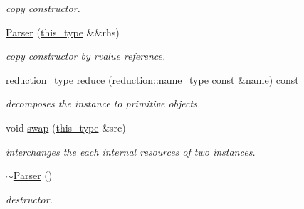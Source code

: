 \begin{DoxyCompactItemize}
\begin{DoxyCompactList}\small\item\em copy constructor. \end{DoxyCompactList}\item 
\hypertarget{classhryky_1_1http_1_1_parser_abdc70dc8d1f9aaa6c98309ecc8c6f22d}{\hyperlink{classhryky_1_1http_1_1_parser_abdc70dc8d1f9aaa6c98309ecc8c6f22d}{Parser} (\hyperlink{classhryky_1_1http_1_1_parser_ad7998597a6ec4d6f9e672e8c4974b117}{this\-\_\-type} \&\&rhs)}\label{classhryky_1_1http_1_1_parser_abdc70dc8d1f9aaa6c98309ecc8c6f22d}

\begin{DoxyCompactList}\small\item\em copy constructor by rvalue reference. \end{DoxyCompactList}\item 
\hypertarget{classhryky_1_1http_1_1_parser_ab034072560d1057658c52f7dd3538c62}{\hyperlink{namespacehryky_a343a9a4c36a586be5c2693156200eadc}{reduction\-\_\-type} \hyperlink{classhryky_1_1http_1_1_parser_ab034072560d1057658c52f7dd3538c62}{reduce} (\hyperlink{namespacehryky_1_1reduction_ac686c30a4c8d196bbd0f05629a6b921f}{reduction\-::name\-\_\-type} const \&name) const }\label{classhryky_1_1http_1_1_parser_ab034072560d1057658c52f7dd3538c62}

\begin{DoxyCompactList}\small\item\em decomposes the instance to primitive objects. \end{DoxyCompactList}\item 
\hypertarget{classhryky_1_1http_1_1_parser_a9e6ce8e433e21cb231e397397a09a534}{void \hyperlink{classhryky_1_1http_1_1_parser_a9e6ce8e433e21cb231e397397a09a534}{swap} (\hyperlink{classhryky_1_1http_1_1_parser_ad7998597a6ec4d6f9e672e8c4974b117}{this\-\_\-type} \&src)}\label{classhryky_1_1http_1_1_parser_a9e6ce8e433e21cb231e397397a09a534}

\begin{DoxyCompactList}\small\item\em interchanges the each internal resources of two instances. \end{DoxyCompactList}\item 
\hypertarget{classhryky_1_1http_1_1_parser_a02bb6d0feb04579300b583ad3258b562}{\hyperlink{classhryky_1_1http_1_1_parser_a02bb6d0feb04579300b583ad3258b562}{$\sim$\-Parser} ()}\label{classhryky_1_1http_1_1_parser_a02bb6d0feb04579300b583ad3258b562}

\begin{DoxyCompactList}\small\item\em destructor. \end{DoxyCompactList}\end{DoxyCompactItemize}
